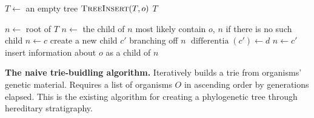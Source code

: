 \begin{algorithm}[h]
    \begin{algorithmic}[1]
            \State $T \gets$ an empty tree
                \State $\textsc{TreeInsert}(T, o)$
            \EndFor
            \State \Return $T$
        \EndFunction

            \State $n \gets$ root of $T$
                \State $n \gets$ the child of $n$ most likely contain $o$, $n$ if there is no such child
                    \State $n \gets c$
                \Else 
                    \State create a new child $c'$ branching off $n$ 
                    \State $\operatorname{differentia}(c') \gets d$
                    \State $n \gets c'$
                \EndIf
            \EndFor
            \State insert information about $o$ as a child of $n$
        \EndFunction
    \end{algorithmic}
    \caption{\textbf{The naive trie-buidling algorithm.} \small Iteratively builds a trie from organisms' genetic material. Requires a list of organisms $O$ in ascending order by generations elapsed. This is the existing algorithm for creating a phylogenetic tree through hereditary stratigraphy. \vspace{-1.5em}}
    \label{alg:old}
\end{algorithm}
